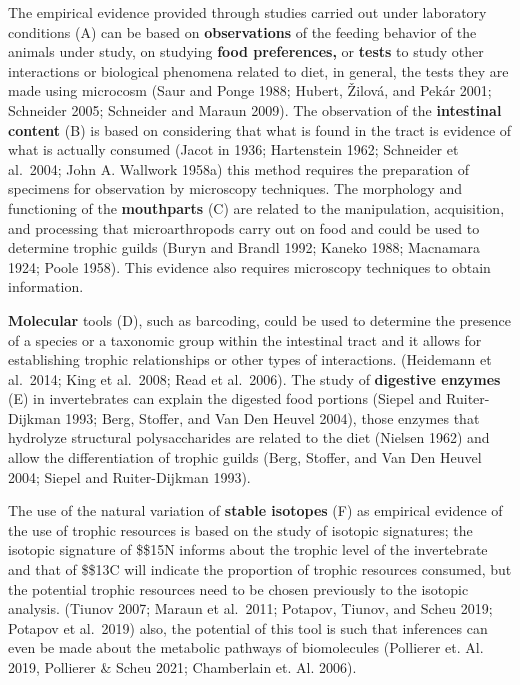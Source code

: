\documentclass[11pt]{article}
\begin{document}
The empirical evidence provided through studies carried out under
laboratory conditions (A) can be based on \textbf{observations} of the
feeding behavior of the animals under study, on studying \textbf{food
preferences,} or \textbf{tests} to study other interactions or
biological phenomena related to diet, in general, the tests they are
made using microcosm (Saur and Ponge 1988; Hubert, Žilová, and Pekár
2001; Schneider 2005; Schneider and Maraun 2009). The observation of the
\textbf{intestinal content} (B) is based on considering that what is
found in the tract is evidence of what is actually consumed (Jacot in
1936; Hartenstein 1962; Schneider et al.~2004; John A. Wallwork 1958a)
this method requires the preparation of specimens for observation by
microscopy techniques. The morphology and functioning of the
\textbf{mouthparts} (C) are related to the manipulation, acquisition,
and processing that microarthropods carry out on food and could be used
to determine trophic guilds (Buryn and Brandl 1992; Kaneko 1988;
Macnamara 1924; Poole 1958). This evidence also requires microscopy
techniques to obtain information.

\textbf{Molecular} tools (D), such as barcoding, could be used to
determine the presence of a species or a taxonomic group within the
intestinal tract and it allows for establishing trophic relationships or
other types of interactions. (Heidemann et al.~2014; King et al.~2008;
Read et al.~2006). The study of \textbf{digestive enzymes} (E) in
invertebrates can explain the digested food portions (Siepel and
Ruiter-Dijkman 1993; Berg, Stoffer, and Van Den Heuvel 2004), those
enzymes that hydrolyze structural polysaccharides are related to the
diet (Nielsen 1962) and allow the differentiation of trophic guilds
(Berg, Stoffer, and Van Den Heuvel 2004; Siepel and Ruiter-Dijkman
1993).

The use of the natural variation of \textbf{stable isotopes} (F) as
empirical evidence of the use of trophic resources is based on the study
of isotopic signatures; the isotopic signature of \$\delta\$15N informs
about the trophic level of the invertebrate and that of \$\delta\$13C
will indicate the proportion of trophic resources consumed, but the
potential trophic resources need to be chosen previously to the isotopic
analysis. (Tiunov 2007; Maraun et al.~2011; Potapov, Tiunov, and Scheu
2019; Potapov et al.~2019) also, the potential of this tool is such that
inferences can even be made about the metabolic pathways of biomolecules
(Pollierer et. Al. 2019, Pollierer \& Scheu 2021; Chamberlain et. Al.
2006).
\end{document}
